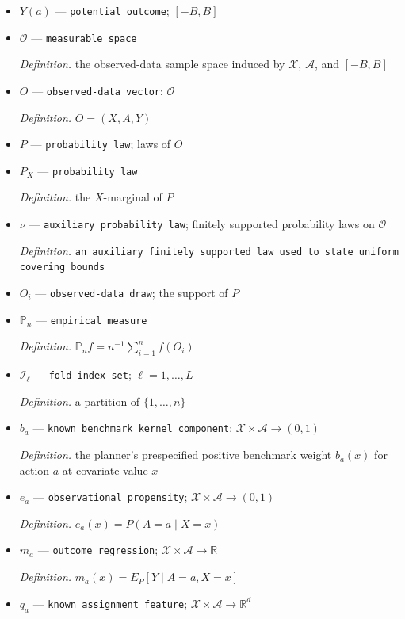 \documentclass{article}
\begin{document}
\begin{itemize}
  \item \(Y(a)\) --- \texttt{potential outcome}; \([-B,B]\)
  \item \(\mathcal O\) --- \texttt{measurable space}
  \par\smallskip\noindent\emph{Definition.} the observed-data sample space induced by \(\mathcal X\), \(\mathcal A\), and \([-B,B]\)
  \item \(O\) --- \texttt{observed-\allowbreak{}data vector}; \(\mathcal O\)
  \par\smallskip\noindent\emph{Definition.} \(O=(X,A,Y)\)
  \item \(P\) --- \texttt{probability law}; laws of \(O\)
  \item \(P_X\) --- \texttt{probability law}
  \par\smallskip\noindent\emph{Definition.} the \(X\)-marginal of \(P\)
  \item \(\nu\) --- \texttt{auxiliary probability law}; finitely supported probability laws on \(\mathcal O\)
  \par\smallskip\noindent\emph{Definition.} \texttt{an auxiliary finitely supported law used to state uniform covering bounds}
  \item \(O_i\) --- \texttt{observed-\allowbreak{}data draw}; the support of \(P\)
  \item \(\mathbb P_n\) --- \texttt{empirical measure}
  \par\smallskip\noindent\emph{Definition.} \(\mathbb P_n f=n^{-1}\sum_{i=1}^n f(O_i)\)
  \item \(\mathcal I_\ell\) --- \texttt{fold index set}; \(\ell=1,\ldots,L\)
  \par\smallskip\noindent\emph{Definition.} a partition of \(\{1,\ldots,n\}\)
  \item \(b_a\) --- \texttt{known benchmark kernel component}; \(\mathcal X\times\mathcal A\to(0,1)\)
  \par\smallskip\noindent\emph{Definition.} the planner's prespecified positive benchmark weight \(b_a(x)\) for action \(a\) at covariate value \(x\)
  \item \(e_a\) --- \texttt{observational propensity}; \(\mathcal X\times\mathcal A\to(0,1)\)
  \par\smallskip\noindent\emph{Definition.} \(e_a(x)=P(A=a\mid X=x)\)
  \item \(m_a\) --- \texttt{outcome regression}; \(\mathcal X\times\mathcal A\to\mathbb R\)
  \par\smallskip\noindent\emph{Definition.} \(m_a(x)=E_P[Y\mid A=a,X=x]\)
  \item \(q_a\) --- \texttt{known assignment feature}; \(\mathcal X\times\mathcal A\to\mathbb R^d\)

\end{itemize}
\end{document}
